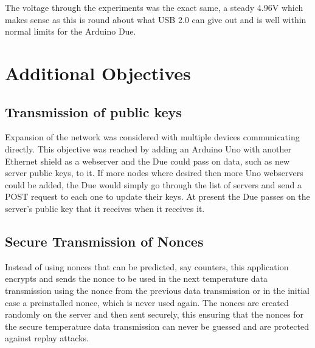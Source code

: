 The voltage through the experiments was the exact same, a steady 4.96V which makes sense as this is round about what USB 2.0 can give out and is well within normal limits for the Arduino Due.




\section{Additional Objectives}

\subsection{Transmission of public keys}

Expansion of the network was considered with multiple devices communicating directly. This objective was reached by adding an Arduino Uno with another Ethernet shield as a webserver and the Due could pass on data, such as new server public keys, to it. If more nodes where desired then more Uno webservers could be added, the Due would simply go through the list of servers and send a POST request to each one to update their keys. At present the Due passes on the server's public key that it receives when it receives it. 

\subsection{Secure Transmission of Nonces}

Instead of using nonces that can be predicted, say counters, this application encrypts and sends the nonce to be used in the next temperature data transmission using the nonce from the previous data transmission or in the initial case a preinstalled nonce, which is never used again. The nonces are created randomly on the server and then sent securely, this ensuring that the nonces for the secure temperature data transmission can never be guessed and are protected against replay attacks.

